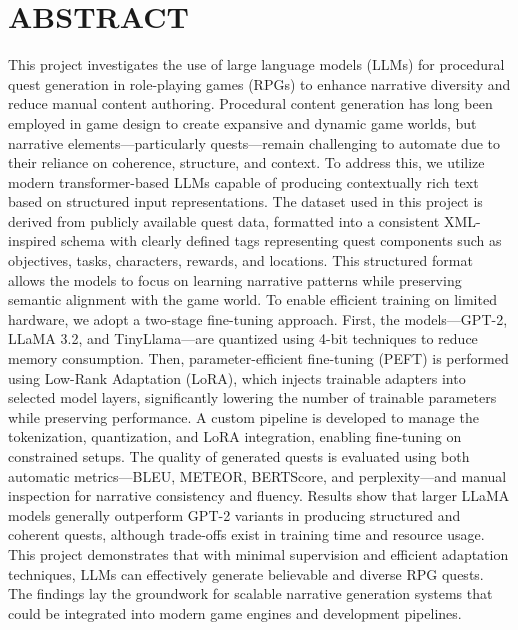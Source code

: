\clearpage

\section*{\centering \large ABSTRACT}

\vspace{2em}

\begin{doublespace}
  \justifying
  \noindent
  This project investigates the use of large language models (LLMs) for procedural quest
  generation in role-playing games (RPGs) to enhance narrative diversity and reduce
  manual content authoring. Procedural content generation has long been employed in game
  design to create expansive and dynamic game worlds, but narrative elements—particularly
  quests—remain challenging to automate due to their reliance on coherence, structure, and
  context. To address this, we utilize modern transformer-based LLMs capable of producing
  contextually rich text based on structured input representations. The dataset used
  in this project is derived from publicly available quest data, formatted into a consistent
  XML-inspired schema with clearly defined tags representing quest components such as
  objectives, tasks, characters, rewards, and locations. This structured format allows the
  models to focus on learning narrative patterns while preserving semantic alignment with
  the game world. To enable efficient training on limited hardware, we adopt a two-stage
  fine-tuning approach. First, the models—GPT-2, LLaMA 3.2, and TinyLlama—are quantized
  using 4-bit techniques to reduce memory consumption. Then, parameter-efficient
  fine-tuning (PEFT) is performed using Low-Rank Adaptation (LoRA), which injects trainable
  adapters into selected model layers, significantly lowering the number of trainable
  parameters while preserving performance. A custom pipeline is developed to manage the
  tokenization, quantization, and LoRA integration, enabling fine-tuning on constrained setups.
  The quality of generated quests is evaluated using both automatic metrics—BLEU,
  METEOR, BERTScore, and perplexity—and manual inspection for narrative consistency
  and fluency. Results show that larger LLaMA models generally outperform GPT-2 variants
  in producing structured and coherent quests, although trade-offs exist in training
  time and resource usage. This project demonstrates that with minimal supervision and
  efficient adaptation techniques, LLMs can effectively generate believable and diverse RPG
  quests. The findings lay the groundwork for scalable narrative generation systems that
  could be integrated into modern game engines and development pipelines.
\end{doublespace}

\newpage
